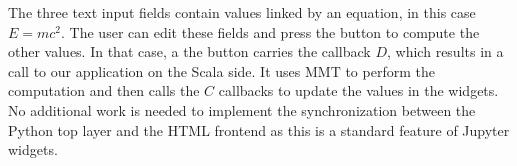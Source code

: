 The three text input fields contain values linked by an equation, in this case $E=mc^2$.
The user can edit these fields and press the button to compute the other values.
In that case, a the button carries the callback $D$, which results in a call to our application on the Scala side.
It uses MMT to perform the computation and then calls the $C$ callbacks to update the values in the widgets.
No additional work is needed to implement the synchronization between the Python top layer and the HTML frontend as this is a standard feature of Jupyter widgets.


